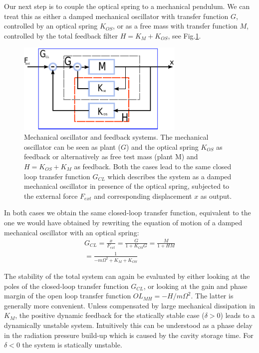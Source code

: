 Our next step is to couple the optical spring to a mechanical pendulum. We can treat this as either a damped mechanical oscillator with transfer function $G$, controlled by an optical spring $K_{OS}$, or as a free mass with transfer function $M$, controlled by the total feedback filter $H = K_M + K_{OS}$, see Fig.\ref{fig:blocks2}.
\begin{figure}[htbp]
	\centering
		\includegraphics[width=8cm]{./figures/blocks_paper.pdf}
	\caption{{Mechanical oscillator and feedback systems. The mechanical oscillator can be seen as plant ($G$) and the optical spring $K_{OS}$ as feedback or
	alternatively as free test mass (plant M) and $H=K_{OS}+K_M$ as feedback. 
	Both the cases lead to the same closed loop transfer function $G_{CL}$ which describes the system as a damped mechanical oscillator in presence of
	the optical spring, subjected to the external force $F_{ext}$ and corresponding displacement $x$ as output.}}
	\label{fig:blocks2}
\end{figure}
In both cases we obtain the same closed-loop transfer function, equivalent to the one we would have obtained by
rewriting the equation of motion of a damped mechanical oscillator with an optical spring:
\begin{eqnarray}
\label{eqn:TFco}
G_{CL}=\frac{x}{F_{ext}}=\frac{G}{1+K_{OS} G}=\frac{M}{1+H M}\nonumber\\
=\frac{1}{-m\Omega^2+K_M+K_{OS}}%
\end{eqnarray}

The stability of the total system can again be evaluated  by either looking at the poles of the closed-loop
transfer function $G_{CL}$, or looking at the gain and phase margin of the open loop transfer function $OL_{MH}=-H/m\Omega^2$. The latter is generally more convenient. Unless compensated by large mechanical dissipation in $K_M$, the positive dynamic feedback for the statically stable case ($\delta>0$) leads to a dynamically unstable system. 
Intuitively this can be understood as a phase delay in the radiation pressure build-up which is caused by the cavity storage time.
For $\delta<0$ the system is statically unstable.

